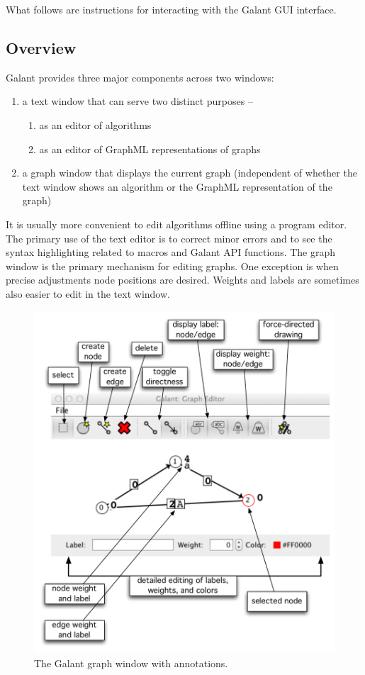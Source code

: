
What follows are instructions for interacting with the Galant GUI interface.

\subsection{Overview}

Galant provides three major components across two windows:
\begin{enumerate}
\item
a text window that can serve two distinct purposes --
\begin{enumerate}
\item as an editor of algorithms
\item as an editor of GraphML representations of graphs
\end{enumerate}
\item
a graph window that displays the current graph (independent of whether
the text window shows an algorithm or the GraphML representation of the graph)
\end{enumerate}

It is usually more convenient to edit algorithms
offline using a program editor.
The primary use of the text editor is to correct minor errors and
to see the syntax highlighting related to macros and Galant API functions.
The graph window is the primary mechanism for editing graphs.
One exception is when precise adjustments node positions are desired.
Weights and labels are sometimes also easier to edit in the text window.



\begin{figure}[p!]
\includegraphics[scale=0.5]{X_graph_window_annotated}
\caption{The Galant graph window with annotations.}
\label{fig:graph_window_annotated}
\end{figure}

